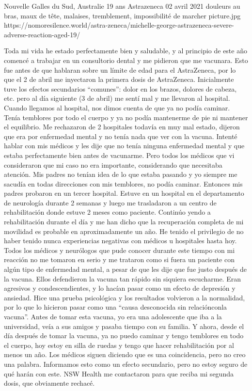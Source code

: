           {Nouvelle Galles du Sud, Australie}
          {19 ans}
          {Astrazeneca}
          {02 avril 2021}
          {douleurs au bras, maux de tête, malaises, tremblement, impossibilité de marcher}
          {picture.jpg}
          {https://nomoresilence.world/astra-zeneca/michelle-george-astrazeneca-severe-adverse-reaction-aged-19/}
          {

Toda mi vida he estado perfectamente bien y saludable, y al principio de este
año comencé a trabajar en un consultorio dental y me pidieron que me
vacunara. Esto fue antes de que hablaran sobre un límite de edad para el
AstraZeneca, por lo que el 2 de abril me inyectaron la primera dosis de
AstraZeneca. Inicialmente tuve los efectos secundarios “comunes”: dolor en los
brazos, dolores de cabeza, etc. pero al día siguiente (3 de abril) me sentí mal
y me llevaron al hospital. Cuando llegamos al hospital, nos dimos cuenta de que
ya no podía caminar. Tenía temblores por todo el cuerpo y ya no podía mantenerme
de pie ni mantener el equilibrio. Me rechazaron de 2 hospitales todavía en muy
mal estado, dijeron que era por enfermedad mental y no tenía nada que ver con la
vacuna. Intenté hablar con mis médicos y les dije que no tenía ninguna
enfermedad mental y que estaba perfectamente bien antes de vacunarme. Pero todos
los médicos que vi consideraron que mi caso no era importante, considerando que
necesitaba atención. Mis padres no tenían idea de lo que estaba pasando y yo
siempre me sacudía en todas direcciones con mis temblores, no podía
caminar. Entonces mis padres probaron en un tercer hospital. Estuve en un
hospital en el departamento de neurología durante 2 semanas y luego me
trasladaron a un centro de rehabilitación donde estuve 2 meses como
paciente. Continúo yendo a rehabilitación durante el día y me han dicho que la
recuperación completa de mi movilidad es probable en aproximadamente un año. He
tenido el privilegio de no haber tenido nunca experiencias negativas con médicos
u hospitales hasta hoy. Todos los médicos y neurólogos que pude conocer durante
este tiempo con mi reacción no me tomaron en serio y me trataron como si fuera
un paciente con algún tipo de enfermedad mental, a pesar de que les dije que fue
justo después de la vacuna. Ellos defendieron la vacuna tan rápido sin siquiera
escucharme. Eran agresivos y condescendientes, y lo hacían pasar como un efecto
de depresión y ansiedad. Hice una prueba psicológica y los resultados volvieron
a la normalidad, por lo que lo hicieron pasar como una “causa desconocida sin
relaciónconla vacuna”. Antes de tomar esta vacuna, yo era una adolescente que
iba a la universidad, veía a sus amigos y pasaba tiempo con su familia. Y ahora,
desde el día después de tomar la vacuna, ya no puedo caminar y tengo temblores
en todo el cuerpo, hoy estoy en silla de ruedas y tengo que hacer rehabilitación
por al menos un año. Los médicos siguen diciendo que es una coincidencia, pero
no creo una palabra. Informamos esto como un efecto secundario, pero no estoy
seguro de qué harán con este. NSW Health me contactaron para que reciba mi
segunda dosis, que obviamente rechacé.

}
